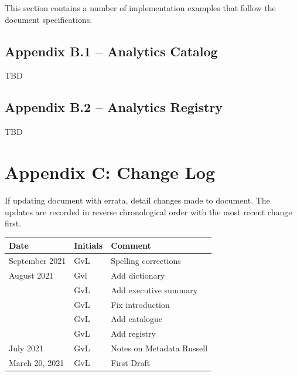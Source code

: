 \documentclass[12pt]{article}
\begin{document}
This section contains a number of implementation examples that follow the document specifications.

\subsection*{Appendix B.1 – Analytics Catalog}

TBD

\subsection*{Appendix B.2 – Analytics Registry}

TBD
\section*{Appendix C: Change Log}

If updating document with errata, detail changes made to document.
The updates are recorded in reverse chronological order with the most recent change first.\\


\begin{tabular}{ p{3cm}p{1cm}p{9cm}}
Date            & Initials & Comment \\
\hline
September 2021  & GvL & Spelling corrections \\
August 2021     & Gvl & 	Add dictionary \\
                & GvL & Add executive summary \\
                & GvL & Fix introduction \\
                & GvL & Add catalogue \\
                & GvL & Add registry \\
July 2021       & GvL & Notes on Metadata Russell \\
March 20, 2021  & GvL & First Draft \\
\hline
\end{tabular}
\end{document}
